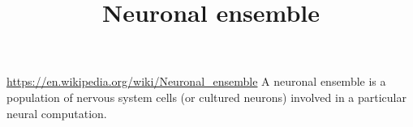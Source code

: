 \documentclass[a4paper]{standalone}
\title{Neuronal ensemble}
\begin{document}
    \maketitle
    \url{https://en.wikipedia.org/wiki/Neuronal_ensemble}
    A neuronal ensemble is a population of nervous system cells (or cultured neurons) involved in a particular neural computation.
\end{document}
